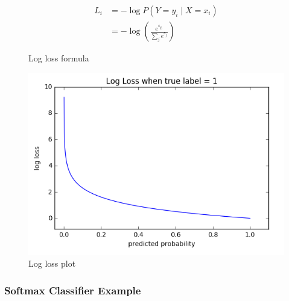 \documentclass{scrartcl}
\begin{document}
\begin{figure}[ht]
	\begin{minipage}[b]{0.45\linewidth}
		\centering
		\begin{align*}
			L_i&=-\log P(Y=y_i \mid X=x_i) \\
			&=-\log (\frac{e^{s_{y_i}}}{\sum_j e^{s_j}})
		\end{align*}
		\caption{Log loss formula}
		\label{fig:figure1}
	\end{minipage}
	\hspace{0.5cm}
	\begin{minipage}[b]{0.45\linewidth}
		\centering
		\includegraphics[width=\textwidth]{figures/Log_loss_graph.png}
		\caption{Log loss plot}
		\label{fig:figure2}
	\end{minipage}
\end{figure}

\subsubsection{Softmax Classifier Example}
\end{document}
